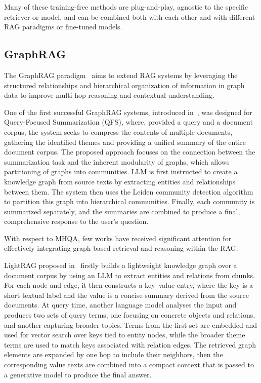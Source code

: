 \documentclass{article}
\begin{document}
Many of these training-free methods are plug-and-play, agnostic to the specific retriever or model, and can be combined both with each other and with different RAG paradigms or fine-tuned models.

\subsection{GraphRAG}
The GraphRAG paradigm~\cite{peng2024graph, han2024retrieval} aims to extend RAG systems by leveraging the structured relationships and hierarchical organization of information in graph data to improve multi-hop reasoning and contextual understanding.

One of the first successful GraphRAG systems, introduced in~\cite{edge2024local}, was designed for Query-Focused Summarization (QFS), where, provided a query and a document corpus, the system seeks to compress the contents of multiple documents, gathering the identified themes and providing a unified summary of the entire document corpus. The proposed approach focuses on the connection between the summarization task and the inherent modularity of graphs, which allows partitioning of graphs into communities. LLM is first instructed to create a knowledge graph from source texts by extracting entities and relationships between them. The system then uses the Leiden community detection algorithm to partition this graph into hierarchical communities. Finally, each community is summarized separately, and the summaries are combined to produce a final, comprehensive response to the user's question.

With respect to MHQA, few works have received significant attention for effectively integrating graph-based retrieval and reasoning within the RAG. 

LightRAG proposed in~\cite{guo2024lightrag} firstly builds a lightweight knowledge graph over a document corpus by using an LLM to extract entities and relations from chunks. For each node and edge, it then constructs a key–value entry, where the key is a short textual label and the value is a concise summary derived from the source documents. At query time, another language model analyses the input and produces two sets of query terms, one focusing on concrete objects and relations, and another capturing broader topics. Terms from the first set are embedded and used for vector search over keys tied to entity nodes, while the broader theme terms are used to match keys associated with relation edges. The retrieved graph elements are expanded by one hop to include their neighbors, then the corresponding value texts are combined into a compact context that is passed to a generative model to produce the final answer.
\end{document}
